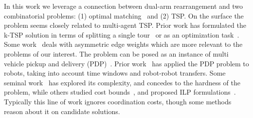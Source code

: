 
In this work we leverage a connection between dual-arm rearrangement and two combinatorial problems: (1) optimal matching~\cite{edmonds1965maximum} and (2) TSP. On the surface the problem seems closely related to multi-agent TSP.
Prior work has formulated the k-TSP solution in terms of splitting a single tour~\cite{frederickson1976approximation} or as an optimization task~\cite{rathinam2006matroid}.
Some work~\cite{friggstad2013multiple} deals with asymmetric edge weights which are more relevant to the problems of our interest. 
The problem can be posed as an instance of multi vehicle pickup and delivery (PDP)~\cite{parragh2008survey}. 
Prior work~\cite{coltin2014multi} has applied the PDP problem to robots, taking into account time windows and robot-robot transfers.
Some seminal work~\cite{lenstra1981complexity,savelsbergh1995general} has explored its complexity, and concedes to the hardness of the problem, while others studied cost bounds~\cite{TrePavFra13}, and proposed ILP formulations~\cite{savelsbergh1995general}. 
Typically this line of work ignores coordination costs, though some methods~\cite{caricato2003parallel} reason about it on candidate solutions.

